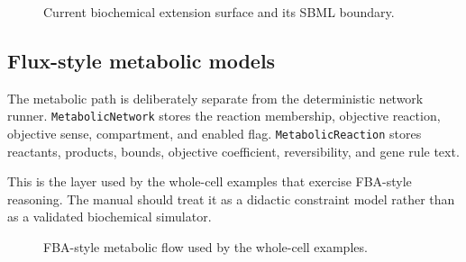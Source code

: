 \begin{figure}[htbp]
\centering
\caption{Current biochemical extension surface and its SBML boundary.}
\label{fig:biochemical-network-surface}
\end{figure}

\subsection{Flux-style metabolic models}

The metabolic path is deliberately separate from the deterministic network
runner. \texttt{MetabolicNetwork} stores the reaction membership, objective
reaction, objective sense, compartment, and enabled flag. \texttt{MetabolicReaction}
stores reactants, products, bounds, objective coefficient, reversibility, and
gene rule text.

This is the layer used by the whole-cell examples that exercise FBA-style
reasoning. The manual should treat it as a didactic constraint model rather than
as a validated biochemical simulator.

\begin{figure}[htbp]
\centering
\caption{FBA-style metabolic flow used by the whole-cell examples.}
\label{fig:fba-flow}
\end{figure}

